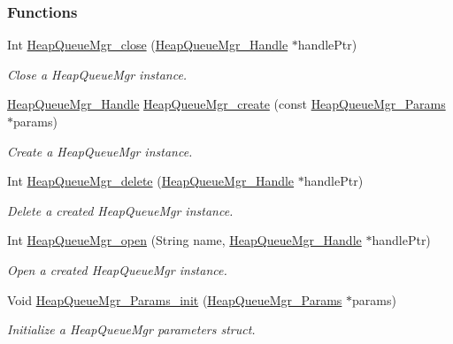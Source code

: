 \subsubsection*{Functions}
\begin{DoxyCompactItemize}
\item 
Int \hyperlink{_heap_queue_mgr_8h_a5504d99b2fc663369c3c01b0cc8453c9}{HeapQueueMgr\_\-close} (\hyperlink{_heap_queue_mgr_8h_a2ef82b5fb989b7b4bfddf91e742e65a8}{HeapQueueMgr\_\-Handle} $\ast$handlePtr)
\begin{DoxyCompactList}\small\item\em Close a HeapQueueMgr instance. \item\end{DoxyCompactList}\item 
\hyperlink{_heap_queue_mgr_8h_a2ef82b5fb989b7b4bfddf91e742e65a8}{HeapQueueMgr\_\-Handle} \hyperlink{_heap_queue_mgr_8h_a8acac32c7ae380cdc55b4951f2df0858}{HeapQueueMgr\_\-create} (const \hyperlink{struct_heap_queue_mgr___params}{HeapQueueMgr\_\-Params} $\ast$params)
\begin{DoxyCompactList}\small\item\em Create a HeapQueueMgr instance. \item\end{DoxyCompactList}\item 
Int \hyperlink{_heap_queue_mgr_8h_ae76096039417c2ba37cc42482ee40962}{HeapQueueMgr\_\-delete} (\hyperlink{_heap_queue_mgr_8h_a2ef82b5fb989b7b4bfddf91e742e65a8}{HeapQueueMgr\_\-Handle} $\ast$handlePtr)
\begin{DoxyCompactList}\small\item\em Delete a created HeapQueueMgr instance. \item\end{DoxyCompactList}\item 
Int \hyperlink{_heap_queue_mgr_8h_acb03450cb0411fe7f122e293150ad601}{HeapQueueMgr\_\-open} (String name, \hyperlink{_heap_queue_mgr_8h_a2ef82b5fb989b7b4bfddf91e742e65a8}{HeapQueueMgr\_\-Handle} $\ast$handlePtr)
\begin{DoxyCompactList}\small\item\em Open a created HeapQueueMgr instance. \item\end{DoxyCompactList}\item 
Void \hyperlink{_heap_queue_mgr_8h_a8e9fe991867f09bd9b7ea7360ee0490c}{HeapQueueMgr\_\-Params\_\-init} (\hyperlink{struct_heap_queue_mgr___params}{HeapQueueMgr\_\-Params} $\ast$params)
\begin{DoxyCompactList}\small\item\em Initialize a HeapQueueMgr parameters struct. \item\end{DoxyCompactList}\item 

\end{DoxyCompactItemize}

